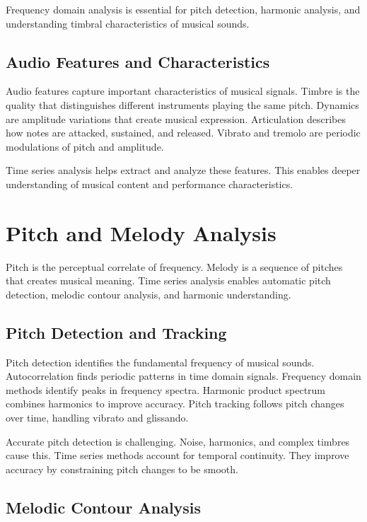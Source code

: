 Frequency domain analysis is essential for pitch detection, harmonic analysis, and understanding timbral characteristics of musical sounds.

\subsection{Audio Features and Characteristics}

Audio features capture important characteristics of musical signals. Timbre is the quality that distinguishes different instruments playing the same pitch. Dynamics are amplitude variations that create musical expression. Articulation describes how notes are attacked, sustained, and released. Vibrato and tremolo are periodic modulations of pitch and amplitude.

Time series analysis helps extract and analyze these features. This enables deeper understanding of musical content and performance characteristics.

\section{Pitch and Melody Analysis}

Pitch is the perceptual correlate of frequency. Melody is a sequence of pitches that creates musical meaning. Time series analysis enables automatic pitch detection, melodic contour analysis, and harmonic understanding.

\subsection{Pitch Detection and Tracking}

Pitch detection identifies the fundamental frequency of musical sounds. Autocorrelation finds periodic patterns in time domain signals. Frequency domain methods identify peaks in frequency spectra. Harmonic product spectrum combines harmonics to improve accuracy. Pitch tracking follows pitch changes over time, handling vibrato and glissando.

Accurate pitch detection is challenging. Noise, harmonics, and complex timbres cause this. Time series methods account for temporal continuity. They improve accuracy by constraining pitch changes to be smooth.

\subsection{Melodic Contour Analysis}

